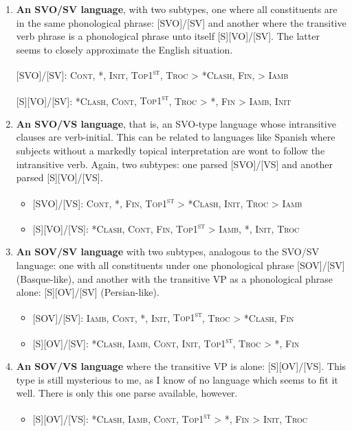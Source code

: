 \documentclass{article}
\newcommand{\noclash}{\textsc{*Clash}}
\newcommand{\iamb}{\textsc{Iamb}}
\newcommand{\cont}{\textsc{Cont}}
\newcommand{\topf}{\textsc{Top1\textsuperscript{st}}}
\newcommand{\nophi}{\textsc{*\textphi}}
\newcommand{\finphi}{\textsc{Fin\textphi}}
\newcommand{\initphi}{\textsc{Init\textphi}}
\newcommand{\troc}{\textsc{Troc}}
\begin{document}
\begin{enumerate}
\item \textbf{An SVO/SV language}, with two subtypes, one where all constituents are in the same phonological phrase: [SVO]/[SV] and another where the transitive verb phrase is a phonological phrase unto itself [S][VO]/[SV].
	The latter seems to closely approximate the English situation.

[SVO]/[SV]: \cont, \nophi, \initphi, \topf, {\troc} {\textgreater} \noclash, {\finphi,} {\textgreater} \iamb

[S][VO]/[SV]: \noclash, \cont, \topf, {\troc} {\textgreater} \nophi, {\finphi} {\textgreater} \iamb, \initphi
\item \textbf{An SVO/VS language}, that is, an SVO-type language whose intransitive clauses are verb-initial.
	This can be related to languages like Spanish where subjects without a markedly topical interpretation are wont to follow the intransitive verb.
		Again, two subtypes: one parsed [SVO]/[VS] and another parsed [S][VO]/[VS].

\begin{itemize}
\item {}[SVO]/[VS]: \cont, \nophi, \finphi, {\topf} {\textgreater} \noclash, \initphi, {\troc} {\textgreater} \iamb
\item {}[S][VO]/[VS]: \noclash, \cont, \finphi, {\topf} {\textgreater} \iamb, \nophi, \initphi, \troc
\end{itemize}
\item \textbf{An SOV/SV language} with two subtypes, analogous to the SVO/SV language: one with all constituents under one phonological phrase [SOV]/[SV] (Basque-like), and another with the transitive VP as a phonological phrase alone: [S][OV]/[SV] (Persian-like).

\begin{itemize}
\item {}[SOV]/[SV]: \iamb, \cont, \nophi, \initphi, \topf, {\troc} {\textgreater} \noclash, \finphi
\item {} [S][OV]/[SV]: \noclash, \iamb, \cont, \initphi, \topf, {\troc} {\textgreater} \nophi, \finphi
\end{itemize}
\item \textbf{An SOV/VS language} where the transitive VP is alone: [S][OV]/[VS].
	This type is still mysterious to me, as I know of no language which seems to fit it well. There is only this one parse available, however.

\begin{itemize}
\item {} [S][OV]/[VS]: \noclash, \iamb, \cont, {\topf} {\textgreater} \nophi, {\finphi} {\textgreater} \initphi, \troc
\end{itemize}


\end{enumerate}
\end{document}
